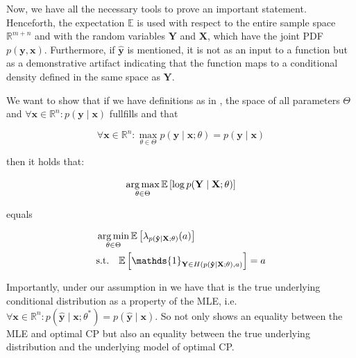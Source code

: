 Now, we have all the necessary tools to prove an important statement. Henceforth, the expectation $\mathbb{E}$ is used with respect to the entire sample space $\mathbb{R}^{m+n}$ and with the random variables $\mathbf{Y}$ and $\mathbf{X}$, which have the joint PDF $p(\mathbf{y}, \mathbf{x})$. Furthermore, if $\mathbf{\hat{y}}$ is mentioned, it is not as an input to a function but as a demonstrative artifact indicating that the function maps to a conditional density defined in the same space as $\mathbf{Y}$.

\begin{theorem}\label{thm:optimal_cp}
    We want to show that if we have definitions as in , the space of all parameters $\Theta$ and $\forall \mathbf{x}\in\mathbb{R}^n: p(\mathbf{y}\mid \mathbf{x})$ fullfills  and that

    \begin{equation}
        \forall \mathbf{x}\in \mathbb{R}^n: \max_{\theta \in \Theta} p(\mathbf{y} \mid \mathbf{x}; \theta) = p(\mathbf{y} \mid \mathbf{x})
        \label{eq:assn_mle_is_true}
    \end{equation}

    then it holds that:

    \begin{equation}
        \operatorname*{arg\,max}_{\theta \in \Theta}  \mathbb{E} \left[ \log
            p(\mathbf{Y} \mid \mathbf{X}; \theta) \right]
        \label{eq:maximum_log_likelihood}
    \end{equation}

    equals

    \begin{align}
         & \argmin_{\theta \in \Theta} \mathbb{E} \left[
            \lambda_{p(\mathbf{\hat{y}}\mid\mathbf{X}; \theta)}( a)
        \right]                                          \\
         & \text{s.t.} \quad \mathbb{E} \left[
        \mathds{1}_{\mathbf{Y} \in
        H(p(\mathbf{\hat{y}} \mid \mathbf{X}; \theta), a)} \right]
        = a
    \end{align}

\end{theorem}

Importantly, under our assumption in  we have that  is the true underlying conditional distribution as a property of the MLE, i.e. $\forall \mathbf{x}\in\mathbb{R}^n: p(\mathbf{\hat{y}}\mid\mathbf{x}; \theta^*) = p(\mathbf{\hat{y}}\mid\mathbf{x})$. So  not only shows an equality between the MLE and optimal CP but also an equality between the true underlying distribution and the underlying model of optimal CP.


